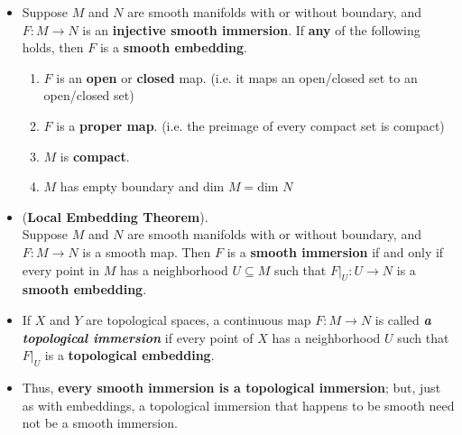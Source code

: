 \documentclass[11pt]{article}
\begin{document}
\begin{itemize}
\item \begin{proposition}
Suppose $M$ and $N$ are smooth manifolds with or without boundary, and $F: M \rightarrow N$ is an \textbf{injective smooth immersion}. If \textbf{any} of the following holds, then $F$ is a\textbf{ smooth embedding}.
\begin{enumerate}
\item $F$ is an \textbf{open} or \textbf{closed} map. (i.e. it maps an open/closed set to an open/closed set)
\item $F$ is a \textbf{proper map}. (i.e. the preimage of every compact set is compact)
\item $M$ is \textbf{compact}.
\item $M$ has empty boundary and $\text{dim }M = \text{dim }N$
\end{enumerate}
\end{proposition}

\item \begin{theorem} (\textbf{Local Embedding Theorem}).  \citep{lee2003introduction}\\
Suppose $M$ and $N$ are smooth manifolds with or without boundary, and $F: M \rightarrow N$ is a smooth map. Then $F$ is a \textbf{smooth immersion} if and only if every point in $M$ has a neighborhood $U\subseteq M$ such that $F|_{U}: U \rightarrow N$ is a \textbf{smooth embedding}.
\end{theorem}

\item \begin{definition}
If $X$ and $Y$ are topological spaces, a continuous map $F: M \rightarrow N$ is called \emph{\textbf{a topological immersion}} if every point of $X$ has a neighborhood $U$ such that $F|_{U}$ is a \textbf{topological embedding}. 
\end{definition}

\item \begin{remark}
Thus, \textbf{every smooth immersion is a topological immersion}; but, just as with embeddings, a topological immersion that happens to be smooth need not be a smooth immersion.
\end{remark}
\end{itemize}
\end{document}
